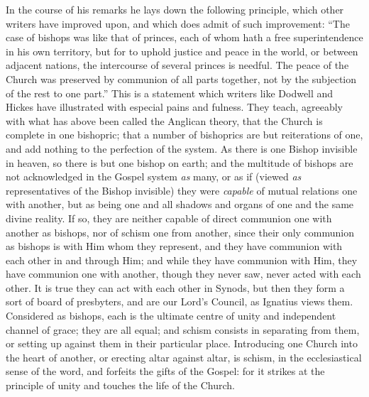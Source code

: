 In the course of his remarks he lays down the
following principle, which other writers have improved upon, and which
does admit of such improvement: ``The case of bishops was like that of
princes, each of whom hath a free superintendence in his own
territory, but for to uphold justice and peace in the world, or
between adjacent nations, the intercourse of several princes is
needful. The peace of the Church was preserved by communion of all
parts together, not by the subjection of the rest to one part.'' This
is a statement which writers like Dodwell and Hickes have
illustrated with especial pains and fulness. They teach, agreeably
with what has above been called the Anglican theory, that the Church
is complete in one bishopric; that a number of bishoprics are but
reiterations of one, and add nothing to the perfection of the system.
As there is one Bishop invisible in heaven, so there is but one bishop
on earth; and the multitude of bishops are not acknowledged in the
Gospel system \emph{as} many, or as if (viewed \emph{as} representatives of
the Bishop invisible) they were \emph{capable} of mutual relations one
with another, but as being one and all shadows and organs of one and
the same divine reality. If so, they are neither capable of direct
communion one with another as bishops, nor of schism one from another,
since their only communion as bishops is with Him whom they represent,
and they have communion with each other in and through Him; and while
they have communion with Him, they have communion one with another,
though they never saw, never acted with each other. It is true they
can act with each other in Synods, but then they form a sort of board
of presbyters, and are our Lord's Council, as Ignatius views them.
Considered as bishops, each is the ultimate centre of unity and
independent channel of grace; they are all equal; and schism consists
in separating from them, or setting up against them in their
particular place. Introducing one Church into the heart of another, or
erecting altar against altar, is schism, in the ecclesiastical sense
of the word, and forfeits the gifts of the Gospel: for it strikes at
the principle of unity and touches the life of the Church.

